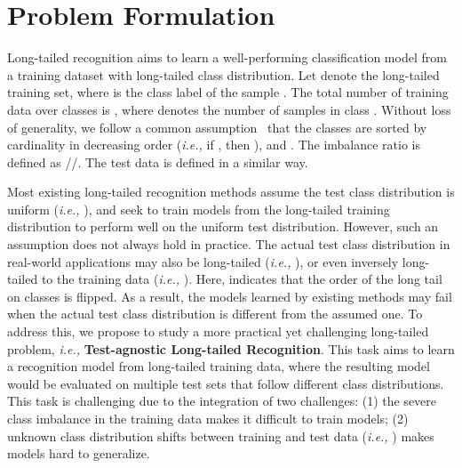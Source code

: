 \documentclass{article}
\def\ie{\emph{i.e.}} \def\Ie{\emph{I.e.}}
\def\ie{\emph{i.e., }}
\begin{document}
  

 
\section{Problem Formulation}\label{sec3}

Long-tailed recognition aims to learn a well-performing classification model from a training dataset  with long-tailed class distribution. Let  denote the long-tailed training set, where  is the class label of the sample . The total number of training data over  classes is , where   denotes the  number of samples in   class . Without loss of generality, we follow a common assumption~\cite{hong2020disentangling,kang2019decoupling} that the    
classes are sorted by cardinality in decreasing order (\ie if , then ), and . The imbalance ratio is defined as //. The test data  is defined in a similar way. 

Most existing long-tailed recognition methods assume the  test class distribution is uniform (\ie ), and    seek to train models from the long-tailed training distribution  to perform well on the uniform test distribution. However,  such an assumption does not always hold    in practice. The actual test class distribution in real-world applications may also   be  long-tailed (\ie ), or even inversely long-tailed to the training data (\ie ). Here,  indicates that  the order of the long tail on  classes is flipped. As a result, the models learned by  existing methods may fail when the actual test class distribution is different from the assumed one.
To address this, we propose to study a more practical yet challenging long-tailed  problem, \ie \textbf{Test-agnostic Long-tailed Recognition}. This task aims to learn a recognition model from long-tailed training data, where the resulting model would be  evaluated on multiple  test sets  that follow different class distributions. This task is   challenging due to the integration of two challenges: (1) the severe  class imbalance in the training data makes  it difficult to train models; (2) unknown class distribution shifts between training and test data (\ie ) makes   models hard to generalize.  
  
 
 
\end{document}
